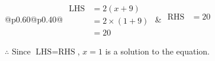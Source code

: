 \documentclass[12pt]{article}
\begin{document}
\begin{multicols}{2}
\begin{minipage}[t]{0.40\textwidth}
    \renewcommand{\arraystretch}{1.3} %
    \begin{tabular}{@{}p{0.60\linewidth}@{}p{0.40\linewidth}@{}}
        \(\begin{aligned}
            \text{LHS} &= 2(x + 9) \\
                    &= 2 \times(1 + 9) \\
                    &= 20
        \end{aligned}\) &
        \(\begin{aligned}
            \text{RHS} &= 20\\
                    & \\
                    &
        \end{aligned}\)
    \end{tabular}
    \renewcommand{\arraystretch}{1.0} %
    \vspace{2pt}  %

    \noindent \(\therefore\) Since \(\text{LHS} = \text{RHS}\), \(x = 1\) is  a solution to the equation.

\end{minipage}

 \vspace*{16pt}
\newpage

\end{multicols}
\end{document}
